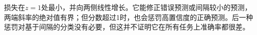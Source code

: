 损失在\(z=1\)处最小，并向两侧线性增长。它能修正错误预测或间隔较小的预测，两端斜率的绝对值有界；但分数超过1时，也会惩罚高置信度的正确预测。后一种惩罚对基于间隔的分类没有必要，但这并不证明它在所有任务上准确率都很差。

